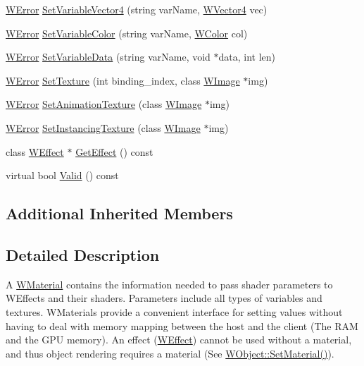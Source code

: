 \begin{DoxyCompactItemize}
\item 
\hyperlink{class_w_error}{W\+Error} \hyperlink{class_w_material_a8ea8adcd3f141f3896adc680e141d02b}{Set\+Variable\+Vector4} (string var\+Name, \hyperlink{class_w_vector4}{W\+Vector4} vec)
\item 
\hyperlink{class_w_error}{W\+Error} \hyperlink{class_w_material_a2d477cb8e3d6cf35a377b4fd438f01d0}{Set\+Variable\+Color} (string var\+Name, \hyperlink{class_w_color}{W\+Color} col)
\item 
\hyperlink{class_w_error}{W\+Error} \hyperlink{class_w_material_ab7a25be78f0609fce4e88bfdcd6aadcb}{Set\+Variable\+Data} (string var\+Name, void $\ast$data, int len)
\item 
\hyperlink{class_w_error}{W\+Error} \hyperlink{class_w_material_a4936e1d25fd3ecce6fbef960eeb75fdf}{Set\+Texture} (int binding\+\_\+index, class \hyperlink{class_w_image}{W\+Image} $\ast$img)
\item 
\hyperlink{class_w_error}{W\+Error} \hyperlink{class_w_material_a02d31133d0c88cd8def56318bb69ff90}{Set\+Animation\+Texture} (class \hyperlink{class_w_image}{W\+Image} $\ast$img)
\item 
\hyperlink{class_w_error}{W\+Error} \hyperlink{class_w_material_ac2ec1357e8a694111bb352711dbfe123}{Set\+Instancing\+Texture} (class \hyperlink{class_w_image}{W\+Image} $\ast$img)
\item 
class \hyperlink{class_w_effect}{W\+Effect} $\ast$ \hyperlink{class_w_material_af80d6b296601457db6d35283c3e3d206}{Get\+Effect} () const 
\item 
virtual bool \hyperlink{class_w_material_a73cd4716c62a5a331f32e211ebd54654}{Valid} () const 
\end{DoxyCompactItemize}
\subsection*{Additional Inherited Members}


\subsection{Detailed Description}
A \hyperlink{class_w_material}{W\+Material} contains the information needed to pass shader parameters to W\+Effects and their shaders. Parameters include all types of variables and textures. W\+Materials provide a convenient interface for setting values without having to deal with memory mapping between the host and the client (The R\+AM and the G\+PU memory). An effect (\hyperlink{class_w_effect}{W\+Effect}) cannot be used without a material, and thus object rendering requires a material (See \hyperlink{class_w_object_add4eb131afa0b55fbb4d5695eee7569c}{W\+Object\+::\+Set\+Material()}). 


